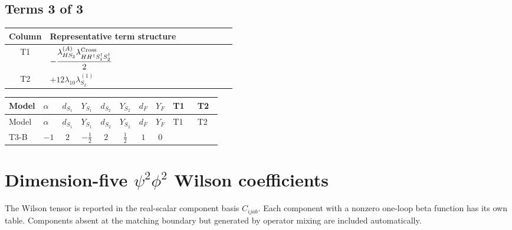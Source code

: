 \documentclass[8pt]{article}
\begin{document}
\begin{landscape}
\subsection*{Terms 3 of 3}
\begin{center}
\begin{tabular}{@{}c >{\raggedright\arraybackslash}p{0.82\linewidth}@{}}
\toprule
Column & Representative term structure \\
\midrule
T1 & \(\displaystyle -\frac{{\lambda_{HS_2}^{(A)}} {\lambda_{H H^\dagger S_1^\dagger S_2^\dagger}^{\rm Cross}}}{2}\) \\
\midrule
T2 & \(\displaystyle +12 {\lambda_{10}} {\lambda_{S_2}^{(1)}}\) \\
\midrule
\bottomrule
\end{tabular}
\end{center}
\smallskip
\tiny
\begin{longtable}{@{}llcccccc >{\raggedright\arraybackslash}p{0.21\linewidth} >{\raggedright\arraybackslash}p{0.21\linewidth}@{}}
\toprule
Model & $\alpha$ & $d_{S_1}$ & $Y_{S_1}$ & $d_{S_2}$ & $Y_{S_2}$ & $d_F$ & $Y_F$ & T1 & T2 \\
\midrule
\endfirsthead
\toprule
Model & $\alpha$ & $d_{S_1}$ & $Y_{S_1}$ & $d_{S_2}$ & $Y_{S_2}$ & $d_F$ & $Y_F$ & T1 & T2 \\
\midrule
\endhead
T3-B & $-1$ & $2$ & $-\frac{1}{2}$ & $2$ & $\frac{1}{2}$ & $1$ & $0$ & \scriptsize\adjustbox{max width=\linewidth}{$\begin{gathered} -\frac{{\lambda_{HS_2}^{(A)}} {\lambda_{H H^\dagger S_1^\dagger S_2^\dagger}^{\rm Cross}}}{2}\end{gathered}$} & \scriptsize\adjustbox{max width=\linewidth}{$\begin{gathered} +12 {\lambda_{10}} {\lambda_{S_2}^{(1)}}\end{gathered}$} \\
\midrule
\bottomrule
\end{longtable}
\clearpage
\section*{Dimension-five $\psi^2\phi^2$ Wilson coefficients}
The Wilson tensor is reported in the real-scalar component basis $C_{ijab}$. Each component with a nonzero one-loop beta function has its own table. Components absent at the matching boundary but generated by operator mixing are included automatically.

\end{landscape}
\end{document}
